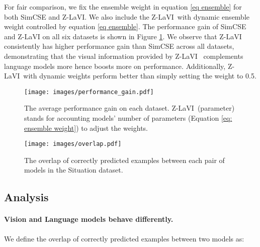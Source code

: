 \documentclass[11pt]{article}
\newcommand{\model}{Z-LaVI}
\begin{document}
For fair comparison, we fix the ensemble weight  in equation \eqref{eq ensemble} for both SimCSE and \model. We also include the \model~with dynamic ensemble weight controlled by equation \eqref{eq ensemble}. The performance gain of SimCSE and Z-LaVI on all six datasets is shown in Figure \ref{fig:pg}. We observe that Z-LaVI consistently has higher performance gain than SimCSE across all datasets, demonstrating that the visual information provided by \model~
complements language models more hence boosts more on performance.
Additionally, \model~with dynamic weights perform better than simply setting the weight to 0.5. 

\begin{figure}[!t]
\centering
    \texttt{[image: images/performance\_gain.pdf]}
    \caption{The average performance gain on each dataset. \model~(parameter) stands for accounting models' number of parameters (Equation \ref{eq: ensemble weight}) to adjust the weights.}
    \label{fig:pg}
\end{figure}

\begin{figure}[!t]
\centering
    \texttt{[image: images/overlap.pdf]}
    \caption{The overlap of correctly predicted examples between each pair of models in the Situation dataset.}
    \label{fig:overlap}
\end{figure}

\subsection{Analysis}
\paragraph{Vision and Language models behave differently.} 
We define the overlap of correctly predicted examples between two models as: 
\end{document}

